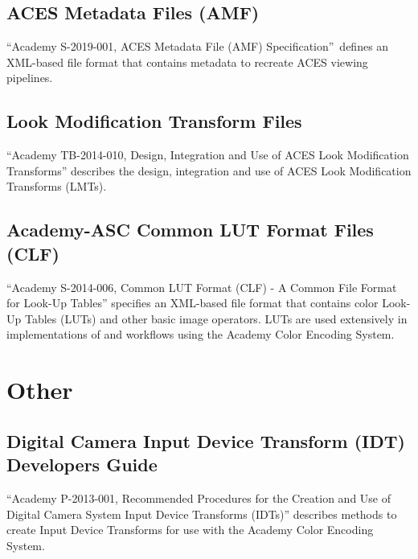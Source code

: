 \subsection{ACES Metadata Files (AMF)}
``Academy S-2019-001, ACES Metadata File (AMF) Specification'' defines an XML-based file format that contains metadata to recreate ACES viewing pipelines.

\subsection{Look Modification Transform Files}
``Academy TB-2014-010, Design, Integration and Use of ACES Look Modification Transforms'' describes the design, integration and use of ACES Look Modification Transforms (LMTs).

\subsection{Academy-ASC Common LUT Format Files (CLF)}
``Academy S-2014-006, Common LUT Format (CLF) - A Common File Format for Look-Up Tables'' specifies an XML-based file format that contains color Look-Up Tables (LUTs) and other basic image operators. LUTs are used extensively in implementations of and workflows using the Academy Color Encoding System.


\section{Other}
\subsection{Digital Camera Input Device Transform (IDT) Developers Guide}
``Academy P-2013-001, Recommended Procedures for the Creation and Use of Digital Camera System Input Device Transforms (IDTs)'' describes methods to create Input Device Transforms for use with the Academy Color Encoding System.